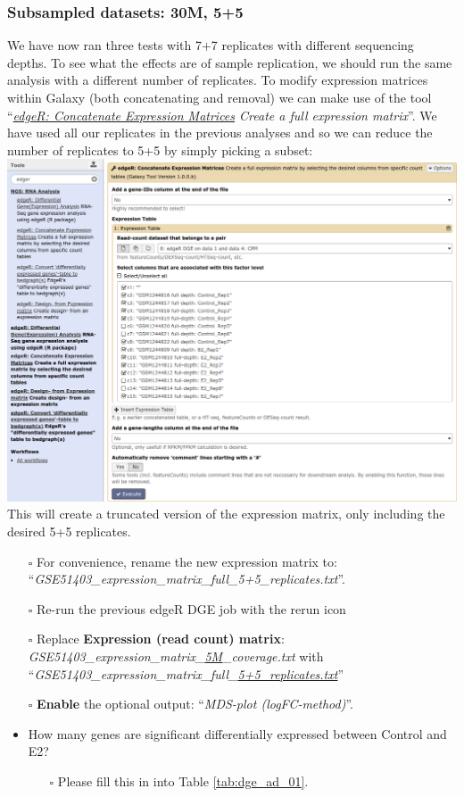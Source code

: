 \subsubsection{Subsampled datasets: 30M, 5+5}
We have now ran three tests with 7+7 replicates with different sequencing depths. To see what the effects are of sample replication, we should run the same analysis with a different number of replicates. To modify expression matrices within Galaxy (both concatenating and removal) we can make use of the tool ``\textit{\underline{edgeR: Concatenate Expression Matrices} Create a full expression matrix}''. We have used all our replicates in the previous analyses and so we can reduce the number of replicates to 5+5 by simply picking a subset:\\
\includegraphics[width=\textwidth]{figures/expression_03.png}\\
This will create a truncated version of the expression matrix, only including the desired 5+5 replicates.
\begin{itemize}
	\item [$\square$] For convenience, rename the new expression matrix to:\\``\textit{GSE51403\_expression\_matrix\_full\_5+5\_replicates.txt}''.
	\item [$\square$] Re-run the previous edgeR DGE job with the rerun icon
	\item [$\square$] Replace \textbf{Expression (read count) matrix}: \textit{GSE51403\_expression\_matrix\_\underline{5M}\_coverage.txt} with ``\textit{GSE51403\_expression\_matrix\_full\_\underline{5+5\_replicates.txt}}''
	\item [$\square$] \textbf{Enable} the optional output: ``\textit{MDS-plot (logFC-method)}''.
	\item How many genes are significant differentially expressed between Control and E2?
	\begin{itemize}
		\item[$\square$] Please fill this in into Table \ref{tab:dge_ad_01}.
	\end{itemize}	
\end{itemize}
